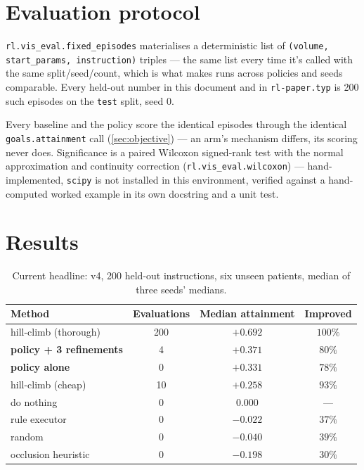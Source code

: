 \documentclass[10pt]{article}
\newcommand{\code}[1]{\texttt{#1}}
\begin{document}
\newpage
\section{Evaluation protocol}

\code{rl.vis\_eval.fixed\_episodes} materialises a deterministic list of
\code{(volume, start\_params, instruction)} triples --- the same list every
time it's called with the same split/seed/count, which is what makes runs
across policies and seeds comparable. Every held-out number in this document
and in \code{rl-paper.typ} is 200 such episodes on the \code{test} split,
seed 0.

Every baseline and the policy score the identical episodes through the
identical \code{goals.attainment} call (\cref{sec:objective}) --- an arm's
mechanism differs, its scoring never does. Significance is a paired Wilcoxon
signed-rank test with the normal approximation and continuity correction
(\code{rl.vis\_eval.wilcoxon}) --- hand-implemented, \code{scipy} is not
installed in this environment, verified against a hand-computed worked
example in its own docstring and a unit test.

\newpage
\section{Results}
\label{sec:results}

\begin{table}[h]
\centering\small
\begin{tabular}{@{}lccc@{}}
\toprule
\textbf{Method} & \textbf{Evaluations} & \textbf{Median attainment} & \textbf{Improved} \\
\midrule
hill-climb (thorough) & 200 & $+0.692$ & $100\%$ \\
\textbf{policy + 3 refinements} & 4 & $\mathbf{+0.371}$ & $80\%$ \\
\textbf{policy alone} & 0 & $\mathbf{+0.331}$ & $78\%$ \\
hill-climb (cheap) & 10 & $+0.258$ & $93\%$ \\
do nothing & 0 & $0.000$ & --- \\
rule executor & 0 & $-0.022$ & $37\%$ \\
random & 0 & $-0.040$ & $39\%$ \\
occlusion heuristic & 0 & $-0.198$ & $30\%$ \\
\bottomrule
\end{tabular}
\caption{Current headline: v4, 200 held-out instructions, six unseen
patients, median of three seeds' medians.}
\end{table}
\end{document}

